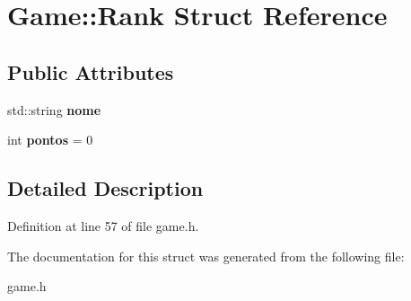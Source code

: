 \hypertarget{struct_game_1_1_rank}{}\section{Game\+:\+:Rank Struct Reference}
\label{struct_game_1_1_rank}
\subsection*{Public Attributes}
\begin{DoxyCompactItemize}
\item 
\hypertarget{struct_game_1_1_rank_a96ed516eff0de27b59eb22284c34cb6d}{}std\+::string {\bfseries nome}\label{struct_game_1_1_rank_a96ed516eff0de27b59eb22284c34cb6d}

\item 
\hypertarget{struct_game_1_1_rank_afa37c13c67a922ace2e342aadee5a4e4}{}int {\bfseries pontos} = 0\label{struct_game_1_1_rank_afa37c13c67a922ace2e342aadee5a4e4}

\end{DoxyCompactItemize}


\subsection{Detailed Description}


Definition at line 57 of file game.\+h.



The documentation for this struct was generated from the following file\+:\begin{DoxyCompactItemize}
\item 
game.\+h\end{DoxyCompactItemize}
